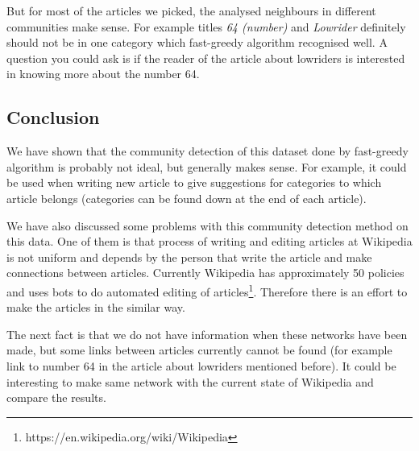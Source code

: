 \documentclass[paper=a4, fontsize=11pt]{scrartcl} %
\begin{document}
But for most of the articles we picked, the analysed neighbours in different communities make sense. For example titles \textit{64 (number)} and \textit{Lowrider} definitely should not be in one category which fast-greedy algorithm recognised well. A question you could ask is if the reader of the article about lowriders is interested in knowing more about the number 64. 

\subsection{Conclusion}
We have shown that the community detection of this dataset done by fast-greedy algorithm is probably not ideal, but generally makes sense. For example, it could be used when writing new article to give suggestions for categories to which article belongs (categories can be found down at the end of each article).

We have also discussed some problems with this community detection method on this data. One of them is that process of writing and editing articles at Wikipedia is not uniform and depends by the person that write the article and make connections between articles. Currently Wikipedia has approximately 50 policies and uses bots to do automated editing of articles\footnote{https://en.wikipedia.org/wiki/Wikipedia}. Therefore there is an effort to make the articles in the similar way.

The next fact is that we do not have information when these networks have been made, but some links between articles currently cannot be found (for example link to number 64 in the article about lowriders mentioned before). It could be interesting to make same network with the current state of Wikipedia and compare the results.
\end{document}
